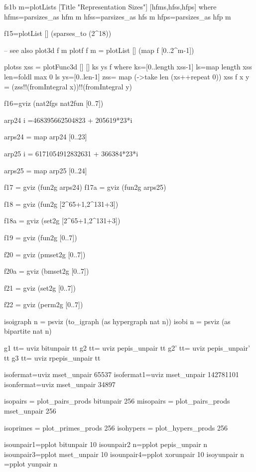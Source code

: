 \documentclass[]{INCLUDES/llncs}
\begin{document}
\begin{code}
fs1b m=plotLists 
  [Title "Representation Sizes"] 
  [hfms,hfss,hfps] where 
       hfms=parsizes_as hfm m
       hfss=parsizes_as hfs m
       hfps=parsizes_as hfp m

             
f15=plotList [] (sparses_to (2^18))

-- see also plot3d f m
plotf f m = plotList [] (map f [0..2^m-1])

plotss xss = plotFunc3d [] [] ks ys f where
  ks=[0..length xss-1]
  ls=map length xss
  len=foldl max 0 ls
  ys=[0..len-1]
  zss= map (\xs->take len (xs++repeat 0)) xss
  f x y =   (zss!!(fromIntegral x))!!(fromIntegral y)
\end{code}

\begin{code}

f16=gviz (nat2fgs nat2fun [0..7])

arp24 i =468395662504823 + 205619*23*i

arps24 = map arp24 [0..23]

arp25 i = 6171054912832631 + 366384*23*i

arps25 = map arp25 [0..24]

f17 = gviz (fun2g arps24)
f17a = gviz (fun2g arps25)

f18 = gviz (fun2g [2^65+1,2^131+3])

f18a = gviz (set2g [2^65+1,2^131+3])


f19 = gviz (fun2g [0..7])

f20 = gviz (pmset2g [0..7])

f20a = gviz (bmset2g [0..7])

f21 = gviz (set2g [0..7])

f22 = gviz (perm2g [0..7])

isoigraph n = psviz (to_igraph (as hypergraph nat n))
isobi n = psviz (as bipartite nat n)

g1 tt= uviz bitunpair tt
g2 tt= uviz pepis_unpair tt
g2' tt= uviz pepis_unpair' tt
g3 tt= uviz rpepis_unpair tt


isofermat=uviz mset_unpair 65537
isofermat1=uviz mset_unpair 142781101
isonfermat=uviz mset_unpair 34897

isopairs = plot_pairs_prods bitunpair 256
misopairs = plot_pairs_prods mset_unpair 256

isoprimes = plot_primes_prods 256
isohypers = plot_hypers_prods 256

isounpair1=pplot bitunpair 10
isounpair2 n=pplot pepis_unpair n
isounpair3=pplot mset_unpair 10
isounpair4=pplot xorunpair 10
isoyunpair n =pplot yunpair n


\end{code}
\end{document}
